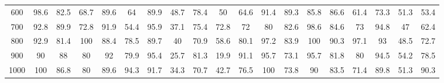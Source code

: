 \begin{table*}
{\begin{tabular}{l cccccc		cccccc		cccccc}
\multicolumn{1}{c}{600} & 98.6 & 82.5 & 68.7 & 89.6 & 64   & 89.9 & 48.7 & 78.4 & 50   & 64.6 & 91.4 & 89.3 & 85.8 & 86.6 &  61.4 & 73.3 & 51.3 & 53.4 \\
\multicolumn{1}{c}{700} & 92.8 & 89.9 & 72.8 & 91.9 & 54.4 & 95.9 & 37.1 & 75.4 & 72.8 & 72   & 80   & 82.6 & 98.6 & 84.6 &  73   & 94.8 & 47 & 62.4 \\ 
\multicolumn{1}{c}{800} & 92.9 & 81.4 & 100  & 88.4 & 78.5 & 89.7 & 40   & 70.9 & 58.6 & 80.1 & 97.2 & 83.9 & 100  & 90.3 &  97.1 & 93 & 48.5 & 72.7\\
\multicolumn{1}{c}{900} & 90   & 88   & 80   & 92   & 79.9 & 95.4 & 25.7 & 81.3 & 19.9 & 91.1 & 95.7 & 73.1 & 95.7 & 81.8 &  80 & 94.5 & 54.2 & 78.5 \\
\multicolumn{1}{c}{1000} & 100 & 86.8 & 80   & 89.6 & 94.3 & 91.7 & 34.3 & 70.7 & 42.7 & 76.5 & 100  & 73.8 & 90   & 83.5 &  71.4  & 89.8 & 51.3 & 90.3 \\
\bottomrule
\end{tabular}
}
\label{tab:tab1}
\end{table*}


